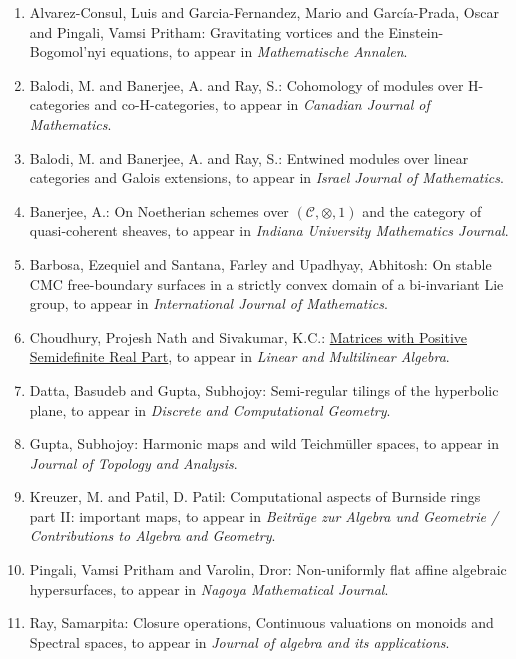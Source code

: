 \begin{enumerate}[resume, leftmargin=27pt]
	\item Alvarez-Consul, Luis and Garcia-Fernandez, Mario  and García-Prada, Oscar and Pingali, Vamsi Pritham: Gravitating vortices and the Einstein-Bogomol’nyi equations, to appear in \emph{Mathematische Annalen}.

	\item Balodi, M. and Banerjee, A. and Ray, S.: Cohomology of modules over H-categories and co-H-categories, to appear in \emph{Canadian Journal of Mathematics}.

	\item Balodi, M. and Banerjee, A. and Ray, S.: Entwined modules over linear categories and Galois extensions, to appear in \emph{Israel Journal of Mathematics}.

	\item Banerjee, A.: On Noetherian schemes over $(\mathcal C,\otimes,1)$ and the category of quasi-coherent sheaves, to appear in \emph{Indiana University Mathematics Journal}.

	\item Barbosa, Ezequiel and Santana, Farley and Upadhyay, Abhitosh: On stable CMC free-boundary surfaces in a strictly convex domain of a bi-invariant Lie group, to appear in \emph{International Journal of Mathematics}.

	\item Choudhury, Projesh Nath and Sivakumar, K.C.: \href{https://doi.org/10.1080/03081087.2019.1602588}{Matrices with Positive Semidefinite Real Part}, to appear in \emph{Linear and Multilinear Algebra}.

	\item\label{datta-gupta:hyperbolic-plane} Datta, Basudeb and Gupta, Subhojoy: Semi-regular tilings of the hyperbolic plane,
	      to appear in \emph{Discrete and Computational Geometry}.

	\item Gupta, Subhojoy: Harmonic maps and wild Teichm{\"u}ller spaces, to appear in {\em Journal of Topology and
			      Analysis}.

	\item Kreuzer, M. and Patil, D. Patil: Computational aspects of Burnside rings part II: important maps, to appear in \emph{Beitr\"age zur Algebra und Geometrie / Contributions to Algebra and Geometry}.

	\item\label{pingali:algebraic-hypersurfaces} Pingali, Vamsi Pritham and Varolin, Dror: Non-uniformly flat affine algebraic hypersurfaces, to appear in {\em Nagoya Mathematical Journal}.


	\item Ray, Samarpita: Closure operations, Continuous valuations on monoids and Spectral spaces, to appear in {\em Journal of algebra and its applications}.
\end{enumerate}
\vspace{0.5mm}


